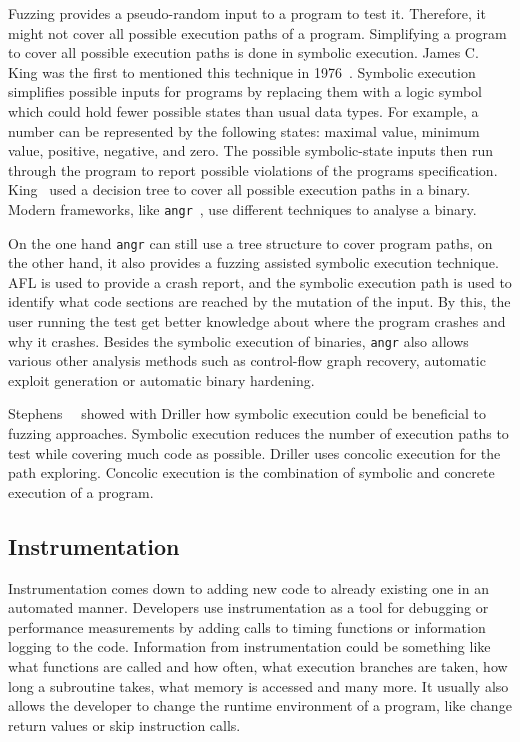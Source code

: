 Fuzzing provides a pseudo-random input to a program to test it. Therefore, it
might not cover all possible execution paths of a program. Simplifying a program
to cover all possible execution paths is done in symbolic execution. James C.
King was the first to mentioned this technique in 1976~\cite{symbolexechist}.
Symbolic execution simplifies possible inputs for programs by replacing them
with a logic symbol which could hold fewer possible states than usual data
types. For example, a number can be represented by the following states: maximal
value, minimum value, positive, negative, and zero. The possible symbolic-state
inputs then run through the program to report possible violations of the
program\textquotesingle s specification. King~\cite{symbolexechist} used a
decision tree to cover all possible execution paths in a binary. Modern
frameworks, like \texttt{angr}~\cite{angrpaper}, use different techniques to
analyse a binary.

On the one hand \texttt{angr} can still use a tree structure to cover program
paths, on the other hand, it also provides a fuzzing assisted symbolic execution
technique. AFL is used to provide a crash report, and the symbolic execution
path is used to identify what code sections are reached by the mutation of the
input. By this, the user running the test get better knowledge about where the
program crashes and why it crashes. Besides the symbolic execution of binaries,
\texttt{angr} also allows various other analysis methods such as control-flow
graph recovery, automatic exploit generation or automatic binary hardening.

Stephens~\etal~\cite{driller} showed with Driller how symbolic execution could
be beneficial to fuzzing approaches. Symbolic execution reduces the number of
execution paths to test while covering much code as possible. Driller uses
concolic execution for the path exploring. Concolic execution is the combination
of symbolic and concrete execution of a program.

\subsection{Instrumentation}

Instrumentation comes down to adding new code to already existing one in an
automated manner. Developers use instrumentation as a tool for debugging or
performance measurements by adding calls to timing functions or information
logging to the code. Information from instrumentation could be something like
what functions are called and how often, what execution branches are taken, how
long a subroutine takes, what memory is accessed and many more. It usually also
allows the developer to change the runtime environment of a program, like change
return values or skip instruction calls.

